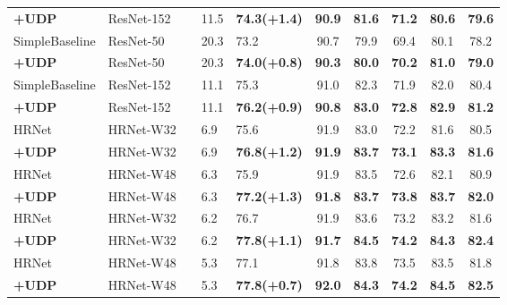 \documentclass[10pt,journal,compsoc]{IEEEtran}
\begin{document}
\begin{table*}
\begin{center}
\begin{tabular}{l|l|c|l|lccccc}
\textbf{+UDP}              & ResNet-152       &    &11.5&\textbf{74.3(+1.4)}  &\textbf{90.9}     &\textbf{81.6}    &\textbf{71.2}   &\textbf{80.6}   &\textbf{79.6}\\
SimpleBaseline\cite{SBNet} & ResNet-50        &    &20.3&73.2             & 90.7      & 79.9      & 69.4     &80.1     &78.2\\
\textbf{+UDP}              & ResNet-50        &    &20.3&\textbf{74.0(+0.8)}  &\textbf{90.3}   &\textbf{ 80.0}    &\textbf{ 70.2}  &\textbf{81.0}   &\textbf{79.0}\\
SimpleBaseline\cite{SBNet} & ResNet-152       &    &11.1&75.3             & 91.0      & 82.3      & 71.9    &82.0      &80.4\\
\textbf{+UDP}              & ResNet-152       &    &11.1&\textbf{76.2(+0.9)}  &\textbf{90.8}    &\textbf{ 83.0}   &\textbf{ 72.8}  &\textbf{82.9}    &\textbf{81.2}\\
\hline
HRNet\cite{HRNet}          & HRNet-W32        &    &6.9&75.6             & 91.9         & 83.0       & 72.2     &81.6     &80.5\\
\textbf{+UDP}              & HRNet-W32        &    &6.9&\textbf{76.8(+1.2)} & \textbf{91.9}       &\textbf{83.7}     & \textbf{73.1}   &\textbf{83.3}   &\textbf{81.6}\\
HRNet\cite{HRNet}          & HRNet-W48        &    &6.3&75.9               & 91.9        & 83.5       & 72.6     &82.1      &80.9\\
\textbf{+UDP }             & HRNet-W48        &    &6.3&\textbf{77.2(+1.3)}  &\textbf{ 91.8}      & \textbf{83.7}    &\textbf{73.8}    &\textbf{83.7}    &\textbf{82.0}\\
HRNet\cite{HRNet}          & HRNet-W32        &    &6.2&76.7             & 91.9       & 83.6       & 73.2     &83.2      &81.6\\
\textbf{+UDP}              & HRNet-W32        &    &6.2&\textbf{77.8(+1.1)} & \textbf{91.7}    & \textbf{84.5}     & \textbf{74.2}   &\textbf{84.3}   &\textbf{82.4}\\
HRNet\cite{HRNet}          & HRNet-W48        &    &5.3&77.1              & 91.8      & 83.8       & 73.5      &83.5     &81.8\\
\textbf{+UDP }             & HRNet-W48        &    &5.3&\textbf{77.8(+0.7)} & \textbf{92.0}     &\textbf{84.3}      &\textbf{74.2}    &\textbf{84.5}   &\textbf{82.5}\\
\hline



\hline
\end{tabular}
\end{center}

\end{table*}
\end{document}
